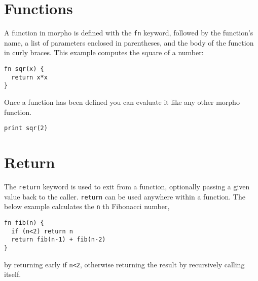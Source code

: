 \hypertarget{functions}{%
\section{Functions}\label{functions}}

A function in morpho is defined with the \texttt{fn} keyword, followed
by the function's name, a list of parameters enclosed in parentheses,
and the body of the function in curly braces. This example computes the
square of a number:

\begin{lstlisting}
fn sqr(x) {
  return x*x
}
\end{lstlisting}

Once a function has been defined you can evaluate it like any other
morpho function.

\begin{lstlisting}
print sqr(2)
\end{lstlisting}

\hypertarget{return}{%
\section{Return}\label{return}}

The \texttt{return} keyword is used to exit from a function, optionally
passing a given value back to the caller. \texttt{return} can be used
anywhere within a function. The below example calculates the \texttt{n}
th Fibonacci number,

\begin{lstlisting}
fn fib(n) {
  if (n<2) return n
  return fib(n-1) + fib(n-2)
}
\end{lstlisting}

by returning early if \texttt{n\textless{}2}, otherwise returning the
result by recursively calling itself.
